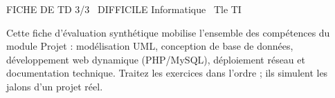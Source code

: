 \documentclass[11pt]{article}
\begin{document}
\begin{tcolorbox}[enhanced,colback=popink,colframe=popink,arc=10pt,boxrule=0pt,left=12pt,right=12pt,top=9pt,bottom=9pt]
{\color{white}\popxbold\small FICHE DE TD 3/3 \textbullet\ DIFFICILE \hfill Informatique \textbullet\ Tle TI\par}
\end{tcolorbox}
\vspace{4pt}
\noindent Cette fiche d'évaluation synthétique mobilise l'ensemble des compétences du module Projet : modélisation UML, conception de base de données, développement web dynamique (PHP/MySQL), déploiement réseau et documentation technique. Traitez les exercices dans l'ordre ; ils simulent les jalons d'un projet réel.
\end{document}
